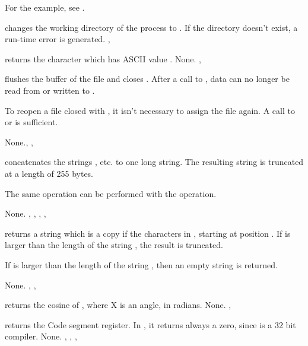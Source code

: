 \documentclass{report}
\begin{document}
For the example, see .

{ changes the working directory of the process to .}
{If the directory  doesn't exist, a run-time error is generated.}
{, }



{ returns the character which has ASCII value .}
{None.}
{,}



{ flushes the buffer of the file  and closes .
After a call to , data can no longer be read from or written to
.

To reopen a file closed with , it isn't necessary to assign the
file again. A call to  or  is sufficient.}
{None.}{, , }



{ concatenates the strings , etc. to one long
string. The resulting string is truncated at a length of 255 bytes.

The same operation can be performed with the \var{+} operation.}
{None.}
{, , , , }



{ returns a string which is a copy if the  characters
in , starting at position . If  is larger than
the length of the string , the result is truncated. 

If  is larger than the length of the string , then an
empty string is returned.}
{None.}
{, , }



{ returns the cosine of , where X is an angle, in radians.}
{None.}
{, }



{ returns the Code segment register. In \fpc, it returns always a
zero, since \fpc is a 32 bit compiler.}
{None.}
{, , , }
\end{document}
